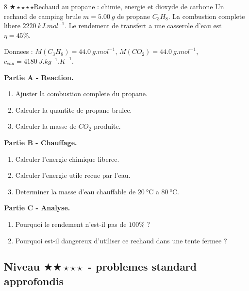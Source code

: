 \documentclass[11pt,a4paper]{article}
\newcommand{\diffone}{\(\bigstar\star\star\star\star\)}
\newcommand{\difftwo}{\(\bigstar\bigstar\star\star\star\)}
\begin{document}
\begin{probleme}{8 \diffone}{Rechaud au propane : chimie, energie et dioxyde de carbone}
Un rechaud de camping brule \(m=\SI{5.00}{g}\) de propane \(C_3H_8\). La combustion complete libere \(\SI{2220}{kJ.mol^{-1}}\). Le rendement de transfert a une casserole d'eau est \(\eta=45\%\).

Donnees : \(M(C_3H_8)=\SI{44.0}{g.mol^{-1}}\), \(M(CO_2)=\SI{44.0}{g.mol^{-1}}\), \(c_{eau}=\SI{4180}{J.kg^{-1}.K^{-1}}\).

\textbf{Partie A - Reaction.}
\begin{enumerate}
\item Ajuster la combustion complete du propane.
\item Calculer la quantite de propane brulee.
\item Calculer la masse de \(CO_2\) produite.
\end{enumerate}

\textbf{Partie B - Chauffage.}
\begin{enumerate}[resume]
\item Calculer l'energie chimique liberee.
\item Calculer l'energie utile recue par l'eau.
\item Determiner la masse d'eau chauffable de \(\SI{20}{\celsius}\) a \(\SI{80}{\celsius}\).
\end{enumerate}

\textbf{Partie C - Analyse.}
\begin{enumerate}[resume]
\item Pourquoi le rendement n'est-il pas de \(100\%\) ?
\item Pourquoi est-il dangereux d'utiliser ce rechaud dans une tente fermee ?
\end{enumerate}
\end{probleme}

\subsection{Niveau \difftwo{} - problemes standard approfondis}
\end{document}
